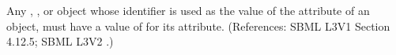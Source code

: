 Any \Compartment, \Species, \Parameter or \SpeciesReference object whose
identifier is used as the value of the attribute  of an
\EventAssignment object, must have a value of  for its
 attribute.  (References: SBML L3V1 Section 4.12.5; SBML L3V2
.)

